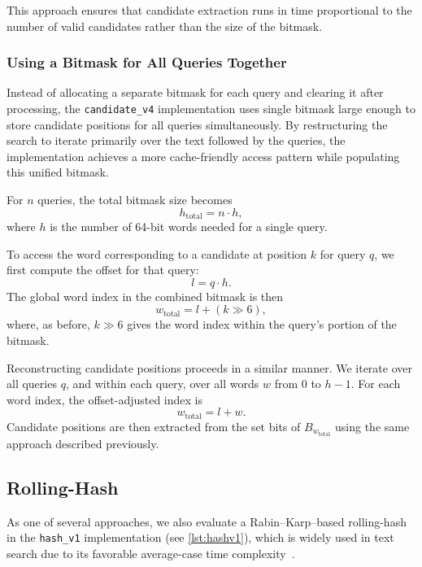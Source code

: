 \documentclass{article}
\begin{document}
    This approach ensures that candidate extraction runs in time proportional to the number of valid candidates rather than the size of the bitmask.

    \subsubsection{Using a Bitmask for All Queries Together}
    Instead of allocating a separate bitmask for each query and clearing it after processing, the \texttt{candidate\_v4} implementation uses single bitmask large enough to store candidate positions for all queries simultaneously.
    By restructuring the search to iterate primarily over the text followed by the queries, the implementation achieves a more cache-friendly access pattern while populating this unified bitmask.

    For $n$ queries, the total bitmask size becomes
    \[
        h_{\text{total}} = n \cdot h,
    \]
    where $h$ is the number of 64-bit words needed for a single query.

    To access the word corresponding to a candidate at position $k$ for query $q$, we first compute the offset for that query:
    \[
        l = q \cdot h.
    \]
    The global word index in the combined bitmask is then
    \[
        w_{\text{total}} = l + (k \gg 6),
    \]
    where, as before, $k \gg 6$ gives the word index within the query's portion of the bitmask.

    Reconstructing candidate positions proceeds in a similar manner.
    We iterate over all queries $q$, and within each query, over all words $w$ from $0$ to $h-1$.
    For each word index, the offset-adjusted index is
    \[
        w_{\text{total}} = l + w.
    \]
    Candidate positions are then extracted from the set bits of $B_{w_{\text{total}}}$ using the same approach described previously.

    \subsection{Rolling-Hash}
    As one of several approaches, we also evaluate a Rabin–Karp–based rolling-hash in the \texttt{hash\_v1} implementation (see \autoref{lst:hashv1}), which is widely used in text search due to its favorable average-case time complexity~\cite{rabin-karp}.
\end{document}
